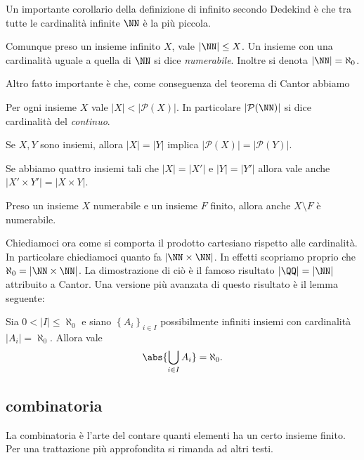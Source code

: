\documentclass[11pt]{scrartcl}
\newcommand{\parti}{\mathcal{P}}
\begin{document}
	Un importante corollario della definizione di infinito secondo Dedekind è che tra tutte le cardinalità infinite $\NN$ è la più piccola. 
	\begin{corollary}
		Comunque preso un insieme infinito $X$, vale $|\NN|\le X$. Un insieme con una cardinalità uguale a quella di $\NN$ si dice \textit{numerabile}. Inoltre si denota $|\NN|=\aleph_0$.
	\end{corollary}
	Altro fatto importante è che, come conseguenza del teorema di Cantor abbiamo
	\begin{corollary}
		Per ogni insieme $X$ vale $|X|<|\parti(X)|$. In particolare $|\parti(\NN)|$ si dice cardinalità del \textit{continuo}.
	\end{corollary}
	\begin{lemma}
		Se $X,Y$ sono insiemi, allora $|X|=|Y|$ implica $|\parti(X)|=|\parti(Y)|$.
	\end{lemma}
	\begin{lemma}
		Se abbiamo quattro insiemi tali che $|X|=|X'|$ e $|Y|=|Y'|$ allora vale anche $|X'\times Y'|=|X\times Y|$. 
	\end{lemma}
	\begin{lemma}
		Preso un insieme $X$ numerabile e un insieme $F$ finito, allora anche $X\setminus F$ è numerabile.
	\end{lemma}
	Chiediamoci ora come si comporta il prodotto cartesiano rispetto alle cardinalità. In particolare chiediamoci quanto fa $|\NN\times\NN|$. In effetti scopriamo proprio che $\aleph_0=|\NN\times\NN|$. La dimostrazione di ciò è il famoso risultato $|\QQ|=|\NN|$ attribuito a Cantor. Una versione più avanzata di questo risultato è il lemma seguente:
	\begin{lemma}
		Sia $0<|I|\le\aleph_0$ e siano $\left\{A_i\right\}_{i\in I}$ possibilmente infiniti insiemi con cardinalità $|A_i|=\aleph_0$. Allora vale
		$$\abs{\bigcup_{i\in I}A_i}=\aleph_0.$$
	\end{lemma}
	
	\subsection{combinatoria}
	
	La combinatoria è l'arte del contare quanti elementi ha un certo insieme finito. Per una trattazione più approfondita si rimanda ad altri testi.
	
\end{document}
